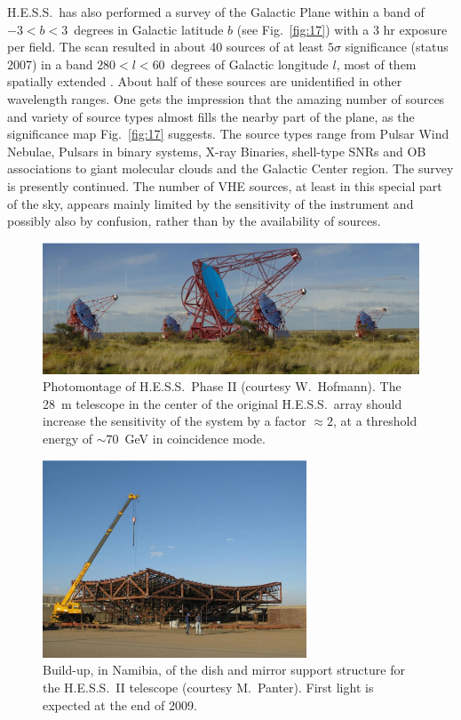 \documentclass{svjour3x}                     %
\newcommand{\hess}{H.E.S.S.}
\begin{document}
\hess\ has also performed a survey of the Galactic Plane within a band of $-3 <
b < 3$~degrees in Galactic latitude $b$ (see Fig.~\ref{fig:17}) with a 3 hr
exposure per field. The scan resulted in about 40 sources of at least $5
\sigma$ significance (status 2007) in a band $280 < l < 60$~degrees of Galactic
longitude $l$, most of them spatially extended \cite{galscan07}. About half
of these sources are unidentified in other wavelength ranges. One gets the
impression that the amazing number of sources and variety of source types
almost fills the nearby part of the plane, as the significance map
Fig.~\ref{fig:17} suggests. The source types range from Pulsar Wind Nebulae,
Pulsars in binary systems, X-ray Binaries, shell-type SNRs and OB associations
to giant molecular clouds and the Galactic Center region. The survey is
presently continued. The number of VHE sources, at least in this special part
of the sky, appears mainly limited by the sensitivity of the instrument and
possibly also by confusion, rather than by the availability of sources.


\begin{figure}[htb]
  \includegraphics[width=\textwidth]{HESS_phase2_x.eps}
  \caption[Photomontage of \hess\ Phase II]{Photomontage of \hess\ Phase II (courtesy W.~Hofmann). 
    The 28~m telescope in the center of
    the original \hess\ array should increase the sensitivity of the system by
    a factor $\approx 2$, at a threshold energy of $\sim 70$~GeV in coincidence
    mode.}
  \label{fig:18}       %
\end{figure}

\begin{figure}[htb]\sidecaption
  \includegraphics[width=0.7\textwidth]{HESS2_dish.eps}
  \caption[\hess\ II dish]{Build-up, in Namibia, of the dish and mirror support structure for
    the \hess\ II telescope (courtesy M.~Panter). 
    First light is expected at the end of 2009.}
  \label{fig:19}       %
\end{figure}
\end{document}
